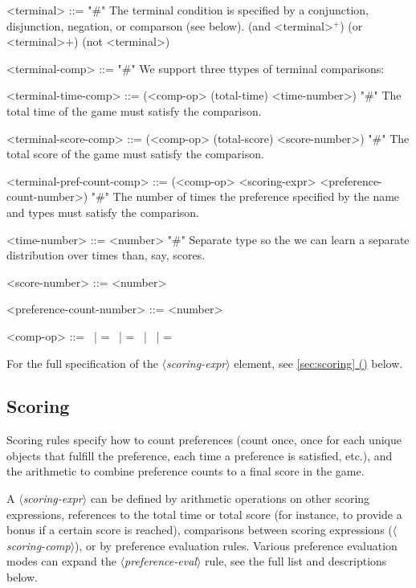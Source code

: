 \documentclass{article}
\newcommand{\dsl}[1]{{\it $\langle$#1$\rangle$}}
\newcommand*{\fullref}[1]{\hyperref[{#1}]{\autoref*{#1} (\nameref*{#1})}} %
\begin{document}
\begin{grammar}
<terminal> ::= "#" The terminal condition is specified by a conjunction, disjunction, negation, or comparson (see below).
        \alt (and <terminal>$^+$)
        \alt (or <terminal>$+$)
        \alt (not <terminal>)

<terminal-comp> ::= "#" We support three ttypes of terminal comparisons:


    <terminal-time-comp> ::= (<comp-op> (total-time) <time-number>) "#" The total time of the game must satisfy the comparison.

    <terminal-score-comp> ::= (<comp-op> (total-score) <score-number>) "#" The total score of the game must satisfy the comparison.

    <terminal-pref-count-comp> ::= (<comp-op> <scoring-expr> <preference-count-number>) "#" The number of times the preference specified by the name and types must satisfy the comparison.

    <time-number> ::= <number>  "#" Separate type so the we can learn a separate distribution over times than, say, scores.

    <score-number> ::= <number>

    <preference-count-number> ::= <number>

    <comp-op> ::=  \textlangle \ | \textlangle = \ | = \ | \textrangle \ | \textrangle =



\end{grammar}
For the full specification of the \dsl{scoring-expr} element, see \fullref{sec:scoring} below.



\subsection{Scoring} \label{sec:scoring}
Scoring rules specify how to count preferences (count once, once for each unique objects that fulfill the preference, each time a preference is satisfied, etc.), and the arithmetic to combine preference counts to a final score in the game.

A \dsl{scoring-expr} can be defined by arithmetic operations on other scoring expressions, references to the total time or total score (for instance, to provide a bonus if a certain score is reached), comparisons between scoring expressions (\dsl{scoring-comp}), or by preference evaluation rules.
Various preference evaluation modes can expand the \dsl{preference-eval} rule, see the full list and descriptions below.
\end{document}

